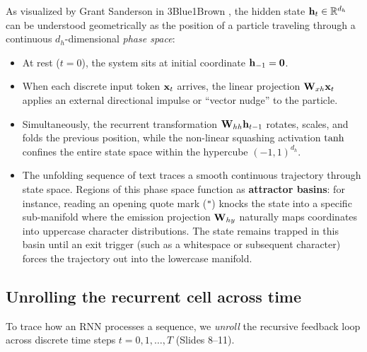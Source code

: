 \documentclass[../../main.tex]{subfiles}
\begin{document}
\begin{intuition}
As visualized by Grant Sanderson in 3Blue1Brown \cite{sanderson2024embeddings}, the hidden state $\mathbf{h}_t \in \mathbb{R}^{d_h}$ can be understood geometrically as the position of a particle traveling through a continuous $d_h$-dimensional \emph{phase space}:
\begin{itemize}
    \item At rest ($t=0$), the system sits at initial coordinate $\mathbf{h}_{-1} = \mathbf{0}$.
    \item When each discrete input token $\mathbf{x}_t$ arrives, the linear projection $\mathbf{W}_{xh} \mathbf{x}_t$ applies an external directional impulse or ``vector nudge'' to the particle.
    \item Simultaneously, the recurrent transformation $\mathbf{W}_{hh} \mathbf{h}_{t-1}$ rotates, scales, and folds the previous position, while the non-linear squashing activation $\tanh$ confines the entire state space within the hypercube $(-1, 1)^{d_h}$.
    \item The unfolding sequence of text traces a smooth continuous trajectory through state space. Regions of this phase space function as \textbf{attractor basins}: for instance, reading an opening quote mark (\texttt{"}) knocks the state into a specific sub-manifold where the emission projection $\mathbf{W}_{hy}$ naturally maps coordinates into uppercase character distributions. The state remains trapped in this basin until an exit trigger (such as a whitespace or subsequent character) forces the trajectory out into the lowercase manifold.
\end{itemize}
\end{intuition}

\subsection{Unrolling the recurrent cell across time}
To trace how an RNN processes a sequence, we \emph{unroll} the recursive feedback loop across discrete time steps $t = 0, 1, \dots, T$ (Slides 8--11).
\end{document}
